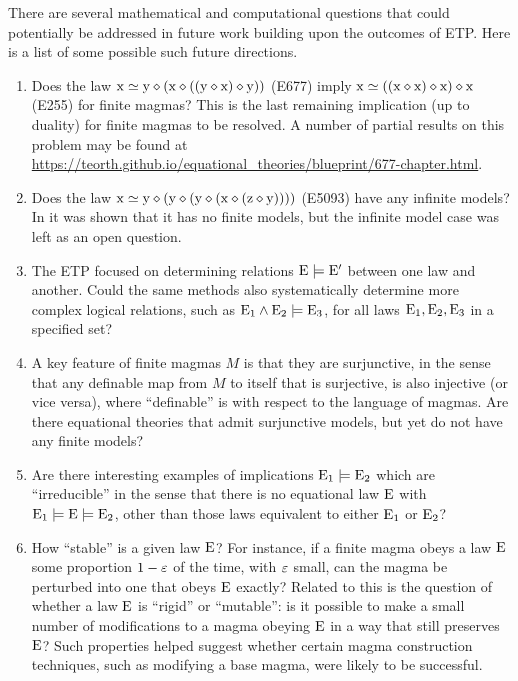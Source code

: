 There are several mathematical and computational questions that could potentially be addressed in future work building upon the outcomes of ETP.  Here is a list of some possible such future directions.
\begin{enumerate}
  \item Does the law $\mathrm{x} \simeq \mathrm{y} \diamond (\mathrm{x} \diamond ((\mathrm{y} \diamond \mathrm{x}) \diamond \mathrm{y}))$ (E677) imply $\mathrm{x} \simeq ((\mathrm{x} \diamond \mathrm{x}) \diamond \mathrm{x}) \diamond \mathrm{x}$ (E255) for finite magmas? This is the last remaining implication (up to duality) for finite magmas to be resolved.  A number of partial results on this problem may be found at \url{https://teorth.github.io/equational_theories/blueprint/677-chapter.html}.
  \item Does the law $\mathrm{x} \simeq \mathrm{y} \diamond (\mathrm{y} \diamond (\mathrm{y} \diamond (\mathrm{x} \diamond (\mathrm{z} \diamond \mathrm{y}))))$ (E5093) have any infinite models? In \cite{Kisielewicz2} it was shown that it has no finite models, but the infinite model case was left as an open question.
  \item The ETP focused on determining relations $\mathrm{E} \models \mathrm{E}'$ between one law and another.  Could the same methods also systematically determine more complex logical relations, such as $\mathrm{E}_1 \wedge \mathrm{E}_2 \models \mathrm{E}_3$, for all laws $\mathrm{E}_1,\mathrm{E}_2,\mathrm{E}_3$ in a specified set?
  \item A key feature of finite magmas $M$ is that they are surjunctive, in the sense that any definable map from $M$ to itself that is surjective, is also injective (or vice versa), where ``definable'' is with respect to the language of magmas.  Are there equational theories that admit surjunctive models, but yet do not have any finite models?
  \item Are there interesting examples of implications $\mathrm{E}_1 \models \mathrm{E}_2$ which are ``irreducible'' in the sense that there is no equational law $\mathrm{E}$ with $\mathrm{E}_1 \models \mathrm{E} \models \mathrm{E}_2$, other than those laws equivalent to either $\mathrm{E}_1$ or $\mathrm{E}_2$?
  \item How ``stable'' is a given law $\mathrm{E}$?  For instance, if a finite magma obeys a law $\mathrm{E}$ some proportion $1-\varepsilon$ of the time, with $\varepsilon$ small, can the magma be perturbed into one that obeys $\mathrm{E}$ exactly?  Related to this is the question of whether a law $\mathrm{E}$ is ``rigid'' or ``mutable'': is it possible to make a small number of modifications to a magma obeying $\mathrm{E}$ in a way that still preserves $\mathrm{E}$?  Such properties helped suggest whether certain magma construction techniques, such as modifying a base magma, were likely to be successful.
\end{enumerate}

